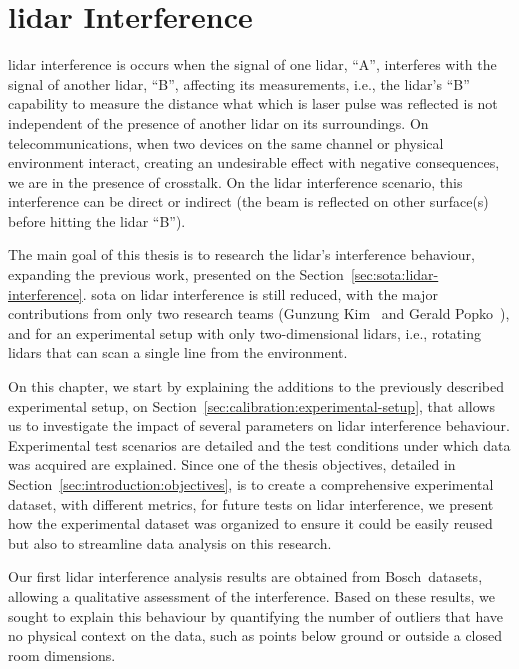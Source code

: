 \chapter{\acs{lidar} Interference}
\label{chapter:lidar-interference}

\ac{lidar} interference is occurs when the signal of one \ac{lidar}, ``A'', interferes with the signal of another \ac{lidar}, ``B'', affecting its measurements, i.e., the \ac{lidar}'s ``B'' capability to measure the distance what which is laser pulse was reflected is not independent of the presence of another \ac{lidar} on its surroundings. On telecommunications, when two devices on the same channel or physical environment interact, creating an undesirable effect with negative consequences, we are in the presence of crosstalk. On the \ac{lidar} interference scenario, this interference can be direct or indirect (the beam is reflected on other surface(s) before hitting the \ac{lidar} ``B'').

The main goal of this thesis is to research the \ac{lidar}'s interference behaviour, expanding the previous work, presented on the Section~\ref{sec:sota:lidar-interference}. \acl{sota} on \ac{lidar} interference is still reduced, with the major contributions from only two research teams (Gunzung Kim\etal~\cite{Kim2015c, Kim2017} and Gerald Popko\etal~\cite{Popko2019a, Popko2019b}), and for an experimental setup with only two-dimensional \acp{lidar}, i.e., rotating \acp{lidar} that can scan a single line from the environment.

On this chapter, we start by explaining the additions to the previously described experimental setup, on Section~\ref{sec:calibration:experimental-setup}, that allows us to investigate the impact of several parameters on \ac{lidar} interference behaviour. Experimental test scenarios are detailed and the test conditions under which data was acquired are explained. Since one of the thesis objectives, detailed in Section~\ref{sec:introduction:objectives}, is to create a comprehensive experimental dataset, with different metrics, for future tests on \ac{lidar} interference, we present how the experimental dataset was organized to ensure it could be easily reused but also to streamline data analysis on this research.

Our first \ac{lidar} interference analysis results are obtained from Bosch\cp~datasets, allowing a qualitative assessment of the interference. Based on these results, we sought to explain this behaviour by quantifying the number of outliers that have no physical context on the data, such as points below ground or outside a closed room dimensions.


